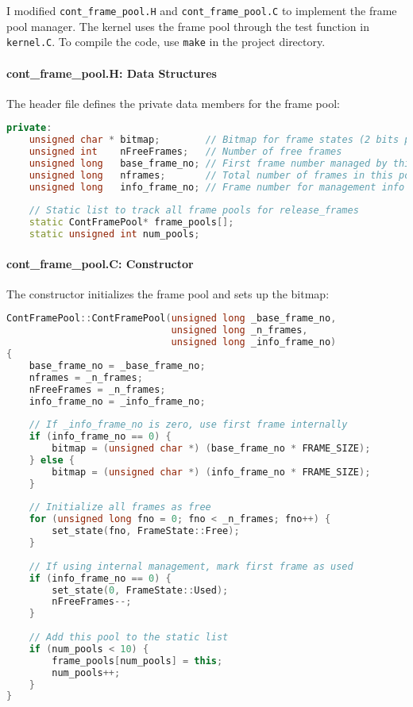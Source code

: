 \documentclass{article}
\begin{document}
I modified \texttt{cont\_frame\_pool.H} and \texttt{cont\_frame\_pool.C} to implement the frame pool manager. The kernel uses the frame pool through the test function in \texttt{kernel.C}. To compile the code, use \texttt{make} in the project directory.

\paragraph{cont\_frame\_pool.H: Data Structures} The header file defines the private data members for the frame pool:

\begin{lstlisting}[language=C++, caption=Frame Pool Data Structures]
private:
    unsigned char * bitmap;        // Bitmap for frame states (2 bits per frame)
    unsigned int    nFreeFrames;   // Number of free frames
    unsigned long   base_frame_no; // First frame number managed by this pool
    unsigned long   nframes;       // Total number of frames in this pool
    unsigned long   info_frame_no; // Frame number for management info (0 = internal)
    
    // Static list to track all frame pools for release_frames
    static ContFramePool* frame_pools[];
    static unsigned int num_pools;
\end{lstlisting}

\paragraph{cont\_frame\_pool.C: Constructor} The constructor initializes the frame pool and sets up the bitmap:

\begin{lstlisting}[language=C++, caption=Frame Pool Constructor]
ContFramePool::ContFramePool(unsigned long _base_frame_no,
                             unsigned long _n_frames,
                             unsigned long _info_frame_no)
{
    base_frame_no = _base_frame_no;
    nframes = _n_frames;
    nFreeFrames = _n_frames;
    info_frame_no = _info_frame_no;
    
    // If _info_frame_no is zero, use first frame internally
    if (info_frame_no == 0) {
        bitmap = (unsigned char *) (base_frame_no * FRAME_SIZE);
    } else {
        bitmap = (unsigned char *) (info_frame_no * FRAME_SIZE);
    }
    
    // Initialize all frames as free
    for (unsigned long fno = 0; fno < _n_frames; fno++) {
        set_state(fno, FrameState::Free);
    }
    
    // If using internal management, mark first frame as used
    if (info_frame_no == 0) {
        set_state(0, FrameState::Used);
        nFreeFrames--;
    }
    
    // Add this pool to the static list
    if (num_pools < 10) {
        frame_pools[num_pools] = this;
        num_pools++;
    }
}
\end{lstlisting}
\end{document}
